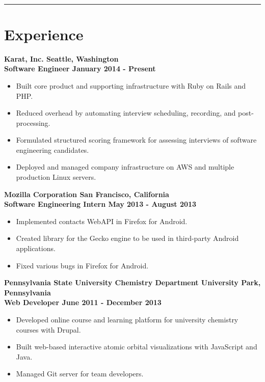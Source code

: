 \documentclass[letterpaper]{article}
\newcommand{\setfontsize}{\fontsize{11.5}{16}\selectfont}
\newcommand{\sectionrule}[1] {
  \noindent\rule{\textwidth}{.1mm}
  \vspace{-11mm}
  \section{#1}
}
\newenvironment{indentsection}
  {\begin{adjustwidth}{10mm}{0pt}}
  {\end{adjustwidth}}
\newcommand{\job}[5] {
  \noindent\textbf{#1 \hfill #2}\\
  \textbf{#3 \hfill #4 - #5}

  \vspace{1mm}
}
\begin{document}
  \setfontsize

  \vspace{2mm}\\

  \sectionrule{Experience}

  \begin{indentsection}
    \job{Karat, Inc.}{Seattle, Washington}{Software Engineer}{January 2014}{Present}
    \begin{itemize}
      \item Built core product and supporting infrastructure with Ruby on Rails and PHP.
      \item Reduced overhead by automating interview scheduling, recording, and post-processing.
      \item Formulated structured scoring framework for assessing interviews of software engineering candidates.
      \item Deployed and managed company infrastructure on AWS and multiple production Linux servers.
    \end{itemize}

    \vspace{5mm}

    \job{Mozilla Corporation}{San Francisco, California}{Software Engineering Intern}{May 2013}{August 2013}
    \begin{itemize}
      \item Implemented contacts WebAPI in Firefox for Android.
      \item Created library for the Gecko engine to be used in third-party Android applications.
      \item Fixed various bugs in Firefox for Android.
    \end{itemize}

    \vspace{5mm}

    \job{Pennsylvania State University Chemistry Department}{University Park, Pennsylvania}{Web Developer}{June 2011}{December 2013}
    \begin{itemize}
      \item Developed online course and learning platform for university chemistry courses with Drupal.
      \item Built web-based interactive atomic orbital visualizations with JavaScript and Java.
      \item Managed Git server for team developers.
    \end{itemize}
  \end{indentsection}
\end{document}
